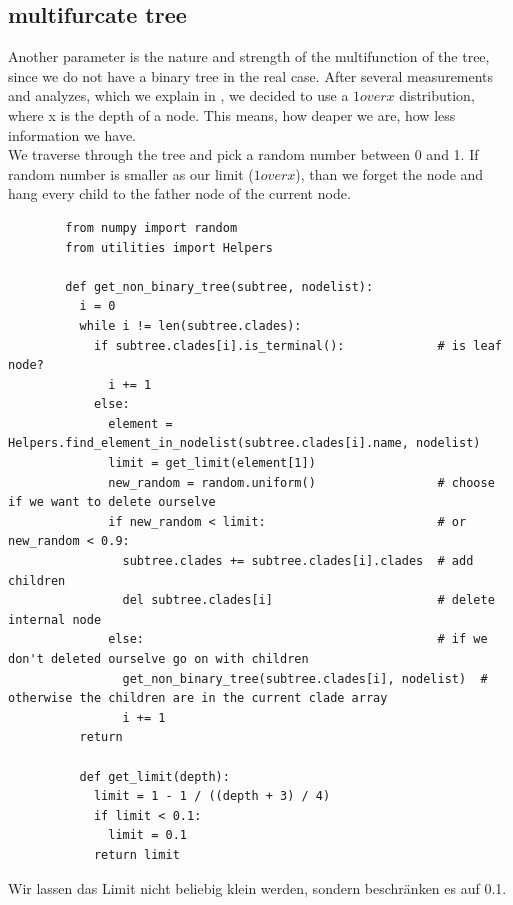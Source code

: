     \subsection{multifurcate tree}
      Another parameter is the nature and strength of the multifunction of the tree, since we do not 
        have a binary tree in the real case. After several measurements and analyzes, which we explain 
        in , we decided to use a $1 over x$ distribution, where x is the depth 
        of a node. This means, how deaper we are, how less information we have. \\
      We traverse through the tree and pick a random number between 0 and 1. If random number is smaller 
        as our limit ($1 over x$), than we forget the node and hang every child to the father node of 
        the current node.
      \begin{lstlisting}
        from numpy import random
        from utilities import Helpers

        def get_non_binary_tree(subtree, nodelist):
          i = 0
          while i != len(subtree.clades):
            if subtree.clades[i].is_terminal():             # is leaf node?
              i += 1
            else:
              element = Helpers.find_element_in_nodelist(subtree.clades[i].name, nodelist)
              limit = get_limit(element[1])
              new_random = random.uniform()                 # choose if we want to delete ourselve
              if new_random < limit:                        # or new_random < 0.9:
                subtree.clades += subtree.clades[i].clades  # add children
                del subtree.clades[i]                       # delete internal node
              else:                                         # if we don't deleted ourselve go on with children
                get_non_binary_tree(subtree.clades[i], nodelist)  # otherwise the children are in the current clade array
                i += 1
          return

          def get_limit(depth):
            limit = 1 - 1 / ((depth + 3) / 4)
            if limit < 0.1:
              limit = 0.1
            return limit
      \end{lstlisting}
      Wir lassen das Limit nicht beliebig klein werden, sondern beschränken es auf 0.1.

